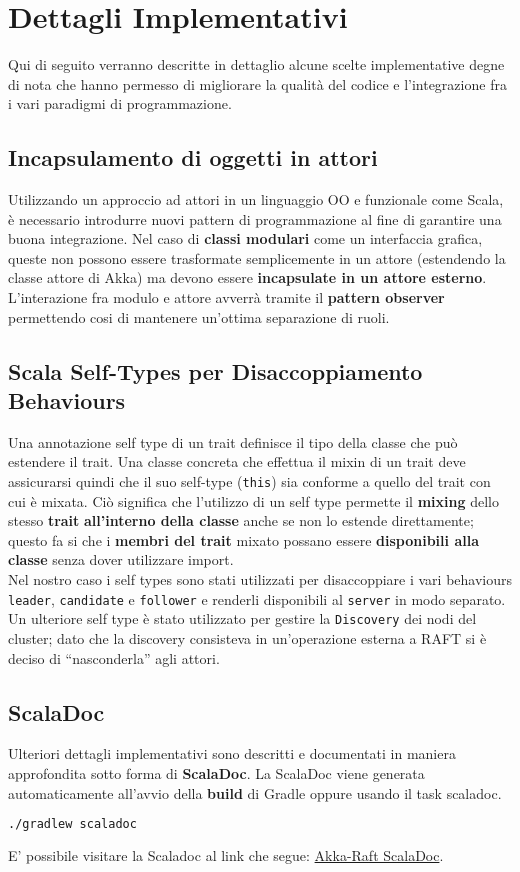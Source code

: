 \section{Dettagli Implementativi}
Qui di seguito verranno descritte in dettaglio alcune scelte implementative degne di nota che hanno permesso di migliorare la qualità del codice e l'integrazione fra i vari paradigmi di programmazione.

  \subsection{Incapsulamento di oggetti in attori}
  Utilizzando un approccio ad attori in un linguaggio OO e funzionale come Scala, è necessario introdurre nuovi pattern di programmazione al fine di garantire una buona integrazione. Nel caso di \textbf{classi modulari} come un interfaccia grafica, queste non possono essere trasformate semplicemente in un attore (estendendo la classe attore di Akka) ma devono essere \textbf{incapsulate in un attore esterno}. L'interazione fra modulo e attore avverrà tramite il \textbf{pattern observer} permettendo cosi di mantenere un'ottima separazione di ruoli.

  \subsection{Scala Self-Types per Disaccoppiamento Behaviours}
  Una annotazione self type di un trait definisce il tipo della classe che può estendere il trait. Una classe concreta che effettua il mixin di un trait deve assicurarsi quindi che il suo self-type (\texttt{this}) sia conforme a quello del trait con cui è mixata. Ciò significa che l'utilizzo di un self type permette il \textbf{mixing} dello stesso \textbf{trait} \textbf{all'interno della classe} anche se non lo estende direttamente; questo fa si che i \textbf{membri del trait} mixato possano essere \textbf{disponibili alla classe} senza dover utilizzare import.\\
  Nel nostro caso i self types sono stati utilizzati per disaccoppiare i vari behaviours \texttt{leader}, \texttt{candidate} e \texttt{follower} e renderli disponibili al \texttt{server} in modo separato. Un ulteriore self type è stato utilizzato per gestire la \texttt{Discovery} dei nodi del cluster; dato che la discovery consisteva in un'operazione esterna a RAFT si è deciso di ``nasconderla'' agli attori.

  \subsection{ScalaDoc}
  Ulteriori dettagli implementativi sono descritti e documentati in maniera approfondita sotto forma di \textbf{ScalaDoc}. La ScalaDoc viene generata automaticamente all'avvio della \textbf{build} di Gradle oppure usando il task scaladoc.
  \begin{lstlisting}[language=bash]
  ./gradlew scaladoc
  \end{lstlisting}
  E' possibile visitare la Scaladoc al link che segue: \href{http://akka-raft.surge.sh/}{Akka-Raft ScalaDoc}.
